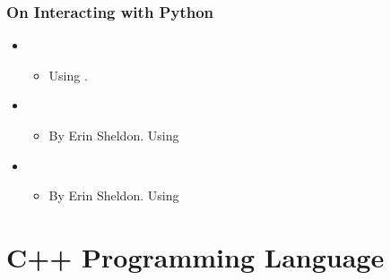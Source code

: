 \documentclass[letterpaper,10pt,english]{sphinxmanual}
\begin{document}
\subsubsection{On Interacting with Python}
\label{\detokenize{resource/programing/clang_basic:on-interacting-with-python}}\begin{itemize}
\item {} 
\begin{itemize}
\item {} 
Using .

\end{itemize}

\item {} 
\begin{itemize}
\item {} 
By Erin Sheldon. Using 

\end{itemize}

\item {} 
\begin{itemize}
\item {} 
By Erin Sheldon. Using 

\end{itemize}

\end{itemize}


\section{C++ Programming Language}
\label{\detokenize{resource/programing/cpp_basic:c-programming-language}}\label{\detokenize{resource/programing/cpp_basic::doc}}
\end{document}
